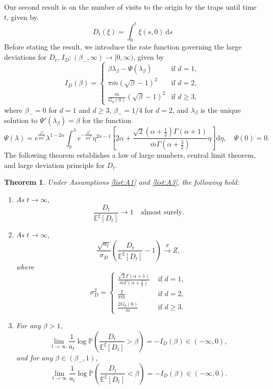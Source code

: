 \documentclass{article}[12pt]
\newtheorem{theorem}{Theorem}[section]
\theoremstyle{definition}
\newcommand{\E}{\mathbb{E}}
\newcommand{\1}{\mathbbm{1}}
\newcommand{\dd }{\mathrm{d} }
\begin{document}
 Our second result is on the number of visits to the origin by the traps until time $t$, given by.
\begin{equation}
    D_t(\xi) = \int_0^t \xi(s,0)\,\dd s
    \label{eqn:Dtdefn}
\end{equation}
Before stating the result, we introduce the rate function governing the large deviations for $D_t$, $I_D: (\beta_-, \infty) \to [0, \infty)$, given by
\begin{equation}
I_D(\beta) = \begin{cases}
    \beta \lambda_\beta - \Psi(\lambda_{\beta}) & \text{if } d=1,\\
    \pi\bar{m}(\sqrt{\beta}-1)^2 & \text{if } d=2,\\
    \frac{\bar{m}}{G_d(0)}(\sqrt{\beta}-1)^2 & \text{if } d \ge 3,
\end{cases}
\label{eqn:rateID}
\end{equation}
where $\beta_- = 0$ for $d =1$ and $d\ge 3$, $\beta_- = 1/4$ for $d=2$, and $\lambda_\beta$ is the unique solution to $\Psi'(\lambda_\beta) = \beta$ for the function
\begin{equation*}
\Psi(\lambda) = e^{\frac{\lambda^2}{2\bar{m}^2}}\lambda^{1-2\alpha}\int_0^\lambda e^{-\frac{\eta^2}{2\bar{m}^2}}\eta^{2\alpha-1}\left[2\alpha + \frac{\sqrt{2}\left(\alpha + \frac{1}{2}\right)\Gamma(\alpha+1)}{\bar{m}\Gamma\left(\alpha + \frac{3}{2}\right)}\eta\right]\mathrm{d}\eta, \quad \Psi(0)=0.
\end{equation*}
The following theorem establishes a law of large numbers, central limit theorem, and large deviation principle for $D_t$.\begin{theorem}\label{thm:Dt}
    Under Assumptions {\rm\ref{list:A1}} and {\rm \ref{list:A3}}, the following hold:
    \begin{enumerate}
        \item[(a)]  As $t\to \infty$, $$\frac{D_t}{\E^\xi[D_t]} \to 1 \quad \text{almost surely.}$$
        \item[(b)]  As $t\to \infty$, $$\frac{\sqrt{a_t}}{\sigma_D}\left(\frac{D_t}{\E^\xi[D_t]}-1\right)\xrightarrow{d}Z,$$ where 
        $$\sigma_D^2 = \begin{cases}
            \frac{\sqrt{2}\Gamma(\alpha +1)}{\bar{m}\Gamma(\alpha + \frac{3}{2})}& \text{ if } d=1,\\
            \frac{2}{\pi \bar{m}} & \text{ if } d=2,\\
            \frac{2G_d(0)}{\bar{m}} & \text{ if } d\ge 3.
        \end{cases}$$
        \item[(c)]  For any $\beta > 1$,
        $$
        \lim_{t \to \infty}\frac{1}{a_t}\log\mathbb{P}\left(\frac{D_t}{\mathbb{E}^\xi[D_t]}> \beta\right) = -I_D(\beta) \in (-\infty, 0),
        $$
        and for any $\beta \in (\beta_-, 1)$,
        $$
        \lim_{t \to \infty}\frac{1}{a_t}\log \mathbb{P}\left(\frac{D_t}{\mathbb{E}^\xi[D_t]}< \beta\right) = -I_D(\beta) \in (-\infty, 0).
        $$
    \end{enumerate}
\end{theorem}
\end{document}
